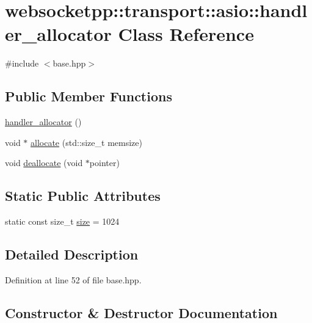 \hypertarget{classwebsocketpp_1_1transport_1_1asio_1_1handler__allocator}{}\section{websocketpp\+:\+:transport\+:\+:asio\+:\+:handler\+\_\+allocator Class Reference}
\label{classwebsocketpp_1_1transport_1_1asio_1_1handler__allocator}


{\ttfamily \#include $<$base.\+hpp$>$}

\subsection*{Public Member Functions}
\begin{DoxyCompactItemize}
\item 
\hyperlink{classwebsocketpp_1_1transport_1_1asio_1_1handler__allocator_a3639b1584c3410758649846529b4c755}{handler\+\_\+allocator} ()
\item 
void $\ast$ \hyperlink{classwebsocketpp_1_1transport_1_1asio_1_1handler__allocator_a526b360a715196645ce1da14c59ae6c7}{allocate} (std\+::size\+\_\+t memsize)
\item 
void \hyperlink{classwebsocketpp_1_1transport_1_1asio_1_1handler__allocator_a8ba1b99267d13036f866f1e10d925efc}{deallocate} (void $\ast$pointer)
\end{DoxyCompactItemize}
\subsection*{Static Public Attributes}
\begin{DoxyCompactItemize}
\item 
static const size\+\_\+t \hyperlink{classwebsocketpp_1_1transport_1_1asio_1_1handler__allocator_aea8d0b7af2997fc2e84e95e459c16ccb}{size} = 1024
\end{DoxyCompactItemize}


\subsection{Detailed Description}


Definition at line 52 of file base.\+hpp.



\subsection{Constructor \& Destructor Documentation}
\hypertarget{classwebsocketpp_1_1transport_1_1asio_1_1handler__allocator_a3639b1584c3410758649846529b4c755}{}
